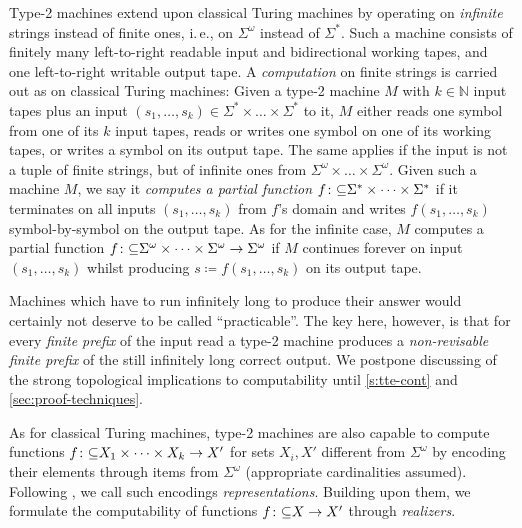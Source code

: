 \documentclass{CSML}
\newcommand{\IN}{\mathbb{N}}
\newcommand{\parcol}{\colon\mathnormal\subseteq}
\newcommand{\Sast}{\Sigma^\ast}
\newcommand{\Cantor}{\Sigma^\omega}
\newcommand{\dfeq}{\coloneqq}
\newcommand{\ie}{\mbox{i.\,e.}\xspace}
\begin{document}
Type-2 machines extend upon classical Turing machines by operating on
\emph{infinite} strings instead of finite ones, \ie, on $\Cantor$
instead of $\Sast$. Such a machine consists of finitely many left-to-right
readable input and bidirectional working tapes, and one left-to-right writable
output tape.
A \emph{computation} on finite strings is carried out as on classical Turing
machines: Given a type-2 machine $M$ with $k \in \IN$ input tapes
plus an input $(s_1,\dots,s_k) \in \Sast \times \dots \times \Sast$ to it,
$M$ either reads one symbol from one of its $k$ input tapes, reads or
writes one symbol on one of its working tapes, or writes a symbol on its output
tape. The same applies if the input is not a tuple of finite strings, but of
infinite ones from $\Cantor \times \dots \times \Cantor$.
Given such a machine $M$, we say it \emph{computes a partial function}
$f \parcol \Sast \times \dots \times \Sast$ if it terminates on all inputs
$(s_1,\dots,s_k)$ from $f$'s domain and writes $f(s_1,\dots,s_k)$
symbol-by-symbol on the output tape.
As for the infinite case, $M$ computes a partial function
$f \parcol \Cantor \times \dots \times \Cantor \to \Cantor$ if $M$ continues
forever on input $(s_1,\dots,s_k)$ whilst producing $s \dfeq f(s_1,\dots,s_k)$
on its output tape.


Machines which have to run infinitely long to produce their answer would
certainly not deserve to be called ``practicable''. The key here, however, is
that for every \emph{finite prefix} of the input read a type-2 machine
produces a \emph{non-revisable finite prefix} of the still infinitely long
correct output. We postpone discussing of the strong topological implications
to computability until \cref{s:tte-cont} and \cref{sec:proof-techniques}.


As for classical Turing machines, type-2 machines are also capable to compute
functions $f \parcol X_1 \times \dots \times X_k \to X'$ for sets $X_i, X'$
different from $\Cantor$ by encoding their elements through items from
$\Cantor$ (appropriate cardinalities assumed).
Following \cite[Def.~2.3.1(2)]{Weih00}, we call such encodings
\emph{representations}. Building upon them, we formulate the computability of
functions $f \parcol X \to X'$ through \emph{realizers}.
\end{document}
